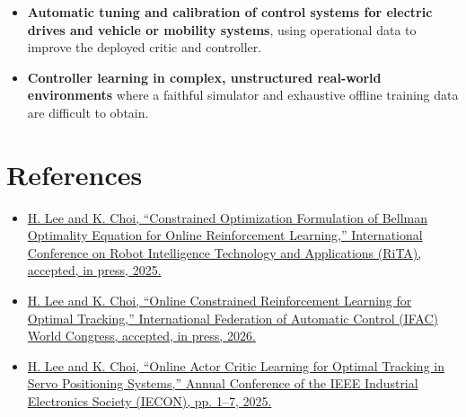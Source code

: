\documentclass[a4paper]{article}
\begin{document}
\begin{itemize}
  \item \textbf{Automatic tuning and calibration of control systems for
  electric drives and vehicle or mobility systems}, using operational data to
  improve the deployed critic and controller.
  \item \textbf{Controller learning in complex, unstructured real-world
  environments} where a faithful simulator and exhaustive offline training
  data are difficult to obtain.
\end{itemize}

\section{References}

\begin{itemize}
  \item
  \href{https://kaist-mic-lab.github.io/publications/2025-constrained-optimization/}{
  H. Lee and K. Choi, ``Constrained Optimization Formulation of Bellman
  Optimality Equation for Online Reinforcement Learning,'' International
  Conference on Robot Intelligence Technology and Applications (RiTA), accepted,
  in press, 2025.
  }
  \item
  \href{https://kaist-mic-lab.github.io/publications/2026-online-constrained/}{
  H. Lee and K. Choi, ``Online Constrained Reinforcement Learning for Optimal
  Tracking,'' International Federation of Automatic Control (IFAC) World
  Congress, accepted, in press, 2026.
  }
  \item
  \href{https://kaist-mic-lab.github.io/publications/2025-online-actor/}{
  H. Lee and K. Choi, ``Online Actor Critic Learning for Optimal Tracking in
  Servo Positioning Systems,'' Annual Conference of the IEEE Industrial
  Electronics Society (IECON), pp. 1--7, 2025.
  }
\end{itemize}





\end{document}

